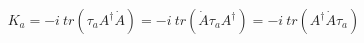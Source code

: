 \begin{equation}
K_a= -i~tr(\tau_a A^\dag \dot{A})=-i~tr(\dot{A} \tau_a A^\dag)=-i~tr(A^\dag \dot{A} \tau_a)
\end{equation}

